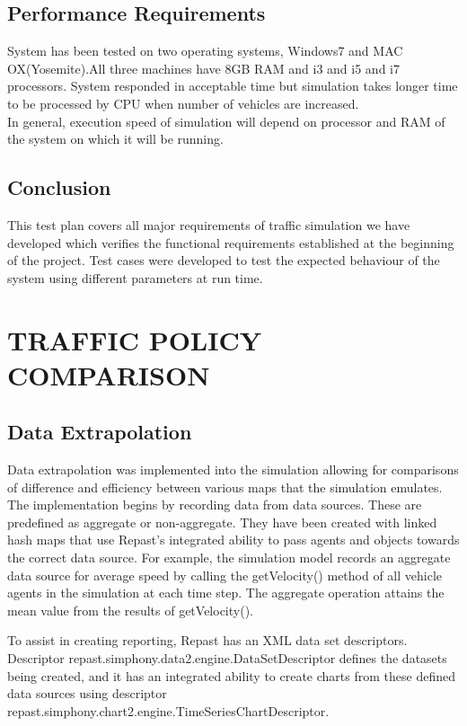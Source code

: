 \documentclass[11pt]{article}
\begin{document}
\begin{enumerate}
\subsection{Performance Requirements}
System has been tested on two operating systems, Windows7 and MAC OX(Yosemite).All three machines have 8GB RAM and i3 and i5 and i7 processors. System responded in acceptable time but simulation takes longer time to be processed by CPU when number of vehicles are increased.\hfil\\
In general, execution speed of simulation will depend on processor and RAM of the system on which it will be running.
\subsection{Conclusion}
This test plan covers all major requirements of traffic simulation we have developed which verifies the functional requirements established at the beginning of the project. Test cases were developed to test the expected behaviour of the system using different parameters at run time.




\section{TRAFFIC POLICY COMPARISON}


\subsection{Data Extrapolation}


Data extrapolation was implemented into the simulation allowing for comparisons of difference and efficiency between various maps that the simulation emulates. The implementation begins by recording data from data sources. These are predefined as aggregate or non-aggregate. They have been created with linked hash maps that use Repast’s integrated ability to pass agents and objects towards the correct data source. For example, the simulation model records an aggregate data source for average speed by calling the getVelocity() method of all vehicle agents in the simulation at each time step. The aggregate operation attains the mean value from the results of getVelocity(). 

To assist in creating reporting, Repast has an XML data set descriptors. Descriptor repast.simphony.data2.engine.DataSetDescriptor defines the datasets being created, and it has an integrated ability to create charts from these defined data sources using descriptor repast.simphony.chart2.engine.TimeSeriesChartDescriptor.


\end{enumerate}
\end{document}
